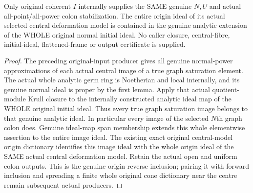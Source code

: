\begin{theorem}
\label{hir:relative-normal-graph-central-whole-analytic-reverse-inclusion}
\leanok
Only original coherent $I$ internally supplies the SAME genuine $N,U$ and actual all-point/all-power colon stabilization. The entire origin ideal of its actual selected central deformation model is contained in the genuine analytic extension of the WHOLE original normal initial ideal. No caller closure, central-fibre, initial-ideal, flattened-frame or output certificate is supplied.
\end{theorem}
\begin{proof}
The preceding original-input producer gives all genuine normal-power approximations of each actual central image of a true graph saturation element. The actual whole analytic germ ring is Noetherian and local internally, and its genuine normal ideal is proper by the first lemma. Apply that actual quotient-module Krull closure to the internally constructed analytic ideal map of the WHOLE original initial ideal. Thus every true graph saturation image belongs to that genuine analytic ideal. In particular every image of the selected $N$th graph colon does. Genuine ideal-map span membership extends this whole elementwise assertion to the entire image ideal. The existing exact original central-model origin dictionary identifies this image ideal with the whole origin ideal of the SAME actual central deformation model. Retain the actual open and uniform colon outputs. This is the genuine origin reverse inclusion; pairing it with forward inclusion and spreading a finite whole original cone dictionary near the centre remain subsequent actual producers.
\end{proof}
